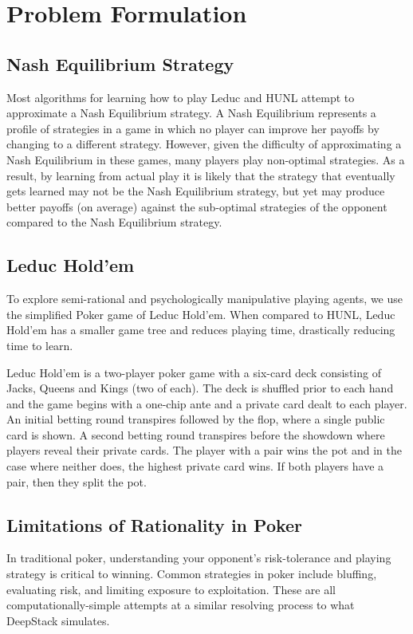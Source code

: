 \documentclass{article}
\begin{document}
\section{Problem Formulation}
\subsection{Nash Equilibrium Strategy}

Most algorithms for learning how to play Leduc and HUNL attempt to approximate a Nash Equilibrium strategy. A Nash Equilibrium represents a profile of strategies in a game in which no player can improve her payoffs by changing to a different strategy. However, given the difficulty of approximating a Nash Equilibrium in these games, many players play non-optimal strategies. As a result, by learning from actual play it is likely that the strategy that eventually gets learned may not be the Nash Equilibrium strategy, but yet may produce better payoffs (on average) against the sub-optimal strategies of the opponent compared to the Nash Equilibrium strategy.

\subsection{Leduc Hold'em}
To explore semi-rational and psychologically manipulative playing agents, we use the simplified Poker game of Leduc Hold'em. When compared to HUNL, Leduc Hold'em has a smaller game tree and reduces playing time, drastically reducing time to learn.

\indent Leduc Hold’em is a two-player poker game with a six-card deck consisting of Jacks, Queens and Kings (two of each). The deck is shuffled prior to each hand and the game begins with a one-chip ante and a private card dealt to each player. An initial betting round transpires followed by the flop, where a single public card is shown. A second betting round transpires before the showdown where players reveal their private cards. The player with a pair wins the pot and in the case where neither does, the highest private card wins. If both players have a pair, then they split the pot.

\subsection{Limitations of Rationality in Poker}
In traditional poker, understanding your opponent's risk-tolerance and playing strategy is critical to winning. Common strategies in poker include bluffing, evaluating risk, and limiting exposure to exploitation. These are all computationally-simple attempts at a similar resolving process to what DeepStack simulates.
\end{document}
